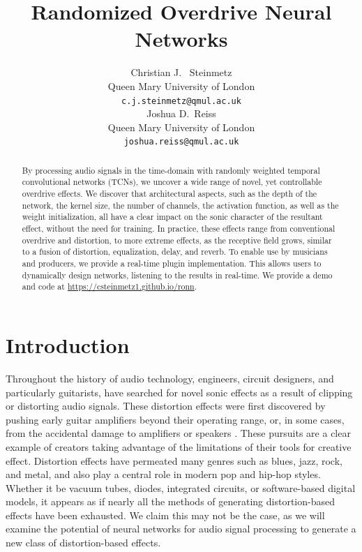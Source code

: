 \documentclass{article}
\title{Randomized Overdrive Neural Networks}
\author{%
  Christian J. ~Steinmetz \\
  Queen Mary University of London\\
  \texttt{c.j.steinmetz@qmul.ac.uk} \\
  \And
  Joshua D.~Reiss \\
  Queen Mary University of London \\
  \texttt{joshua.reiss@qmul.ac.uk} \\
}
\begin{document}
 
\maketitle
\vspace{-0.3cm}

\begin{abstract}
By processing audio signals in the time-domain with randomly weighted temporal convolutional networks (TCNs),
we uncover a wide range of novel, yet controllable overdrive effects.
We discover that architectural aspects, such as the depth of the network, 
the kernel size, the number of channels, the activation function, as well as the weight initialization, 
all have a clear impact on the sonic character of the resultant effect, without the need for training. 
In practice, these effects range from conventional overdrive and distortion,
to more extreme effects, as the receptive field grows, similar to a fusion of distortion, equalization, delay, and reverb.  
To enable use by musicians and producers, we provide a real-time plugin implementation.
This allows users to dynamically design networks, listening to the results in real-time.
We provide a demo and code at \small{\url{https://csteinmetz1.github.io/ronn}}.
\end{abstract} 


\section{Introduction}

Throughout the history of audio technology, engineers, circuit designers, 
and particularly guitarists, have searched for novel sonic effects as a result of clipping or distorting audio signals. 
These distortion effects were first discovered by pushing early guitar amplifiers beyond their operating range, 
or, in some cases, from the accidental damage to amplifiers or speakers \cite{shepherd2003distortion}. 
These pursuits are a clear example of creators taking advantage of the limitations of their tools for creative effect.
Distortion effects have permeated many genres such as blues, jazz, rock, and metal, and also play a central role in modern pop and hip-hop styles.
Whether it be vacuum tubes, diodes, integrated circuits, or software-based digital models,
it appears as if nearly all the methods of generating distortion-based effects have been exhausted.
We claim this may not be the case, as we will examine the potential of neural networks for audio signal processing to generate a new class of distortion-based effects. 
\end{document}

